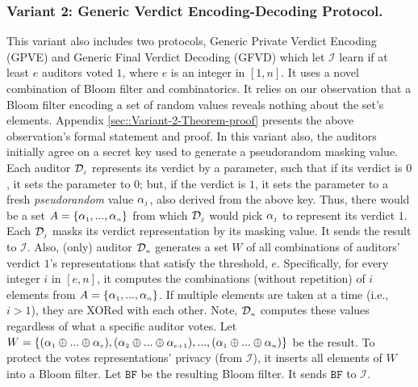 \vspace{-2mm}
\subsubsection{Variant 2: Generic Verdict  Encoding-Decoding Protocol.} This variant also includes two protocols, Generic Private Verdict Encoding (GPVE) and Generic Final Verdict Decoding (GFVD) which   let $\mathcal{I}$ learn if at least $e$ auditors voted $1$, where $e$ is an integer in  $[1, n]$. It  uses a novel combination of   Bloom filter and combinatorics. It  relies on our observation that a Bloom filter  encoding a set of random values reveals nothing about the set's elements.  Appendix \ref{sec::Variant-2-Theorem-proof} presents the above observation's formal statement and  proof.  
%
In this variant  also, the auditors initially agree on a secret key  used  to  generate a pseudorandom masking value. Each auditor $\mathcal{D}_{\scriptscriptstyle j}$ represents its verdict by a parameter, such that if its verdict is $0$,   it  sets the parameter to  $0$; but, if   the verdict is $1$, it sets the parameter to a fresh \emph{pseudorandom} value $\alpha_{\scriptscriptstyle j}$, also derived from the above key. Thus, there would be a set $A=\{\alpha_{\scriptscriptstyle 1},..., \alpha_{\scriptscriptstyle n}\}$ from which   $\mathcal{D}_{\scriptscriptstyle j}$ would pick $\alpha_{\scriptscriptstyle j}$ to represent its verdict $1$. Each $\mathcal{D}_{\scriptscriptstyle j}$ masks its verdict representation by its masking  value. It sends the result to $\mathcal{I}$. Also, (only) auditor $\mathcal{D}_{\scriptscriptstyle n}$  generates a set $W$  of all  combinations of auditors' verdict $1$'s representations that satisfy the threshold, $e$.  Specifically,  for every integer $i$ in $[e, n]$, it computes the combinations (without repetition) of $i$ elements from  $A=\{\alpha_{\scriptscriptstyle 1},..., \alpha_{\scriptscriptstyle n}\}$. If  multiple elements are taken at a time (i.e., $i>1$), they are XORed with each other.   Note, $\mathcal{D}_{\scriptscriptstyle n}$ computes these values    regardless of what a specific  auditor  votes.   Let $W=\{(\alpha_{\scriptscriptstyle 1}\oplus ... \oplus \alpha_{\scriptscriptstyle e}),  (\alpha_{\scriptscriptstyle 2}\oplus  ... \oplus \alpha_{\scriptscriptstyle e+1}), ..., (\alpha_{\scriptscriptstyle 1}\oplus ... \oplus \alpha_{\scriptscriptstyle n})\}$ be the result. To protect   the votes representations' privacy (from $\mathcal{I}$), it inserts all elements of $W$ into a Bloom filter. Let $\mathtt{BF}$ be the resulting Bloom filter. It sends $\mathtt{BF}$ to $\mathcal{I}$. 


